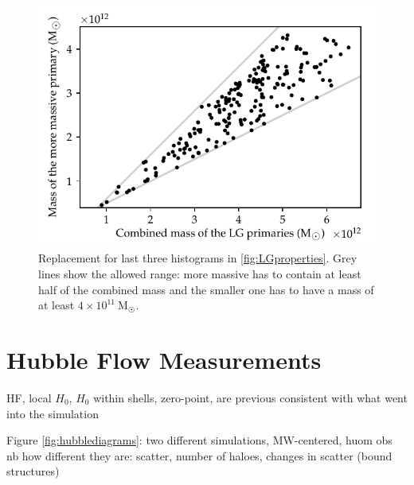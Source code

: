 \documentclass[english, oneside]{HYgradu}
\begin{document}
\begin{figure}
    \centering
    \includegraphics{kuvat/LGmasses.pdf}
    \caption{Replacement for last three histograms in \ref{fig:LGproperties}. Grey lines show the allowed range: more massive has to contain at least half of the combined mass and the smaller one has to have a mass of at least $4 \times 10^{11}~\mathrm{M_{\astrosun}}$.}\label{fig:LGmasses}
\end{figure}


\section{Hubble Flow Measurements}
HF, local $H_0$, $H_0$ within shells, zero-point, are previous consistent with what went into the simulation

Figure \ref{fig:hubblediagrams}: two different simulations, MW-centered, huom obs nb how different they are: scatter, number of haloes, changes in scatter (bound structures)
\end{document}
